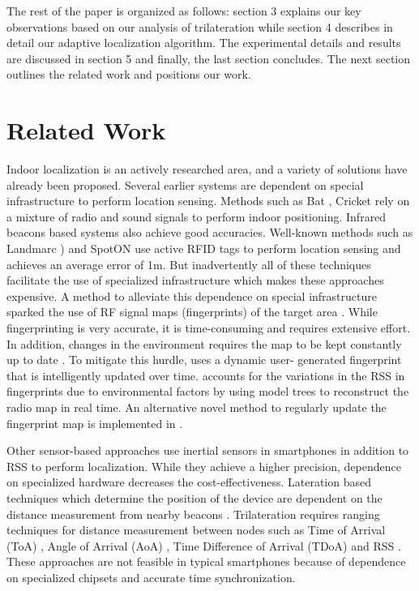 \documentclass[twocolumn]{svjour3}
\begin{document}
The rest of the paper is organized as follows: section 3 explains our key observations based on our analysis of trilateration while section 4 describes in detail our adaptive localization algorithm. The experimental details and results are discussed in section 5 and finally, the last section concludes. The next section outlines the related work and positions our work.

\section{\textbf{Related Work}}

Indoor localization is an actively researched area, and a variety of solutions have already been proposed. Several earlier systems are dependent on special infrastructure to perform location sensing. Methods such as Bat \citep*{barshan1992bat}, Cricket \citep*{priyantha2000cricket} rely on a mixture of radio and sound signals to perform indoor positioning. Infrared beacons \citep*{want1992active} based systems also achieve good accuracies. Well-known methods such as Landmarc \citep*{ni2004landmarc}) and SpotON \citep*{ hightower2000spoton} use active RFID tags to perform location sensing and \citep*{ni2004landmarc} achieves an average error of 1m. But inadvertently all of these techniques facilitate the use of specialized infrastructure which makes these approaches expensive. A method to alleviate this dependence on special infrastructure sparked the use of RF signal maps (fingerprints) of the target area \citep*{kaemarungsi2012analysis, zhang15, ekahau, 4796924,Hossain20151}. 
While fingerprinting is very accurate, it is time-consuming and requires extensive effort. In addition, changes in the environment requires the map to be kept constantly up to date  \citep*{4796924}. To mitigate this hurdle, \citep*{ledlie2012mole} uses a dynamic user- generated fingerprint that is intelligently updated over time. \citep*{yin2008LEMT} accounts for the variations in the RSS in fingerprints due to environmental factors by using model trees to reconstruct the radio map in real time. An alternative novel method to regularly update the fingerprint map is implemented in \citep*{krishnan2014robust}.

Other sensor-based approaches \citep*{li2012Intertial1, qian2013Intertial2} use inertial sensors in smartphones in addition to RSS to perform localization. While they achieve a higher precision, dependence on specialized hardware decreases the cost-effectiveness. Lateration based techniques which determine the position of the device are dependent on the distance measurement from nearby beacons \citep*{farid2013recent}. Trilateration requires ranging techniques for distance measurement between nodes such as Time of Arrival (ToA) \citep*{TOA}, Angle of Arrival (AoA) \citep*{AOA}, Time Difference of Arrival (TDoA) and RSS \citep*{roxin2007survey, Xiao:2016:SWI:2966278.2933232}. These approaches are not feasible in typical smartphones because of dependence on specialized chipsets and accurate time synchronization.
\end{document}
